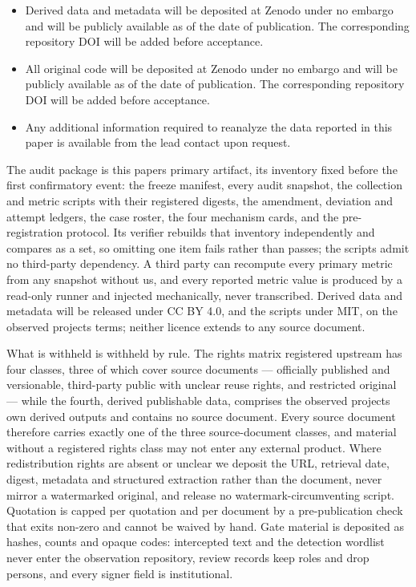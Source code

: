 \documentclass[
  english,
]{article}
\providecommand{\tightlist}{%
  \setlength{\itemsep}{0pt}\setlength{\parskip}{0pt}}
\begin{document}
\begin{itemize}
\tightlist
\item
  Derived data and metadata will be deposited at Zenodo under no embargo and will be publicly available as of the date of publication. The corresponding repository DOI will be added before acceptance.
\item
  All original code will be deposited at Zenodo under no embargo and will be publicly available as of the date of publication. The corresponding repository DOI will be added before acceptance.
\item
  Any additional information required to reanalyze the data reported in this paper is available from the lead contact upon request.
\end{itemize}

The audit package is this paper\textquotesingle s primary artifact, its inventory fixed before the first confirmatory event: the freeze manifest, every audit snapshot, the collection and metric scripts with their registered digests, the amendment, deviation and attempt ledgers, the case roster, the four mechanism cards, and the pre-registration protocol. Its verifier rebuilds that inventory independently and compares as a set, so omitting one item fails rather than passes; the scripts admit no third-party dependency. A third party can recompute every primary metric from any snapshot without us, and every reported metric value is produced by a read-only runner and injected mechanically, never transcribed. Derived data and metadata will be released under CC BY 4.0, and the scripts under MIT, on the observed project\textquotesingle s terms; neither licence extends to any source document.

What is withheld is withheld by rule. The rights matrix registered upstream has four classes, three of which cover source documents --- officially published and versionable, third-party public with unclear reuse rights, and restricted original --- while the fourth, derived publishable data, comprises the observed project\textquotesingle s own derived outputs and contains no source document. Every source document therefore carries exactly one of the three source-document classes, and material without a registered rights class may not enter any external product. Where redistribution rights are absent or unclear we deposit the URL, retrieval date, digest, metadata and structured extraction rather than the document, never mirror a watermarked original, and release no watermark-circumventing script. Quotation is capped per quotation and per document by a pre-publication check that exits non-zero and cannot be waived by hand. Gate material is deposited as hashes, counts and opaque codes: intercepted text and the detection wordlist never enter the observation repository, review records keep roles and drop persons, and every signer field is institutional.
\end{document}
